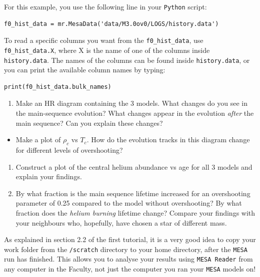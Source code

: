 \documentclass[11pt,a4paper]{article}
\begin{document}
\begin{enumerate}
For this example, you use the following line in your \texttt{Python} script:

\begin{lstlisting}[style=pythonstyle]
f0_hist_data = mr.MesaData('data/M3.0ov0/LOGS/history.data')
\end{lstlisting}


To read a specific columns you want from the \texttt{f0\_hist\_data}, use \texttt{f0\_hist\_data.X}, where X is the name of one of the columns inside \texttt{history.data}. 
The names of the columns can be found inside \texttt{history.data}, or you can print the available column names by typing: 

\begin{lstlisting}[style=pythonstyle]
print(f0_hist_data.bulk_names)
\end{lstlisting}

\begin{enumerate}

  \item Make an HR diagram containing the 3 models. What changes do you see in the main-sequence evolution? What changes appear in the evolution \emph{after} the main sequence? Can you explain these changes?

\end{enumerate}

\begin{itemize}
  \item Make a plot of $\rho_c$ vs $T_c$. How do the evolution tracks in this diagram change for different levels of overshooting?
\end{itemize}

\begin{enumerate}

  \item Construct a plot of the central helium abundance vs age for all 3 models and explain your findings. 

  \item By what fraction is the main sequence lifetime increased for an overshooting parameter of 0.25 compared to the model without overshooting? By what fraction does the \emph{helium burning} lifetime change? Compare your findings with your neighbours who, hopefully, have chosen a star of different mass.

\end{enumerate}

\end{enumerate}


\begin{tcolorbox}[protipbox]
As explained in section 2.2 of the first tutorial, it is a very good idea to copy your work folder from the \verb|/scratch| directory to your home directory, after the \texttt{MESA} run has finished. This allows you to analyse your results using \texttt{MESA Reader} from any computer in the Faculty, not just the computer you ran your \texttt{MESA} models on! 
\end{tcolorbox}
\end{document}
